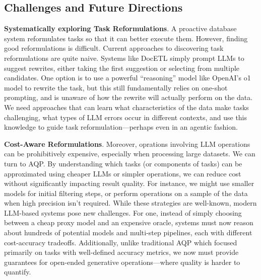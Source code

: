 
\subsection{Challenges and Future Directions}

\textbf{Systematically exploring Task Reformulations}. A proactive database system reformulates tasks so that it can better execute them. However, finding good reformulations is difficult. Current approaches to discovering task reformulations are quite naive. Systems like DocETL simply prompt LLMs to suggest rewrites, either taking the first suggestion or selecting from multiple candidates. One option is to use a powerful ``reasoning'' model like OpenAI's o1 model to rewrite the task, but this still fundamentally relies on one-shot prompting, and is unaware of how the rewrite will actually perform on the data. We need approaches that can learn what characteristics of the data make tasks challenging, what types of LLM errors occur in different contexts, and use this knowledge to guide task reformulation---perhaps even in an agentic fashion.



\textbf{Cost-Aware Reformulations}. Moreover, oprations involving LLM operations can be prohibitively expensive, especially when processing large datasets. We can turn to AQP. By understanding which tasks (or components of tasks) can be approximated using cheaper LLMs or simpler operations, we can reduce cost without significantly impacting result quality. For instance, we might use smaller models for initial filtering steps, or perform operations on a sample of the data when high precision isn't required. While these strategies are well-known, modern LLM-based systems pose new challenges. For one, instead of simply choosing between a cheap proxy model and an expensive oracle, systems must now reason about hundreds of potential models and multi-step pipelines, each with different cost-accuracy tradeoffs. Additionally, unlike traditional AQP which focused primarily on tasks with well-defined accuracy metrics, we now must provide guarantees for open-ended generative operations---where quality is harder to quantify.

